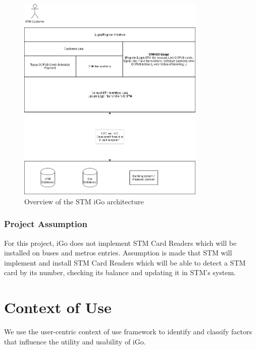 \documentclass[11pt, english]{article}
\begin{document}
\begin{figure}[H]
  
  \includegraphics[width=0.8\textwidth]{ContextOfUse.png}
  \centering
  \caption{ Overview of the STM iGo architecture}

\end{figure}

\subsubsection{Project Assumption}

For this project, iGo does not implement STM Card Readers which will be installed on buses and metros entries. Assumption is made that STM will implement and install STM Card Readers which will be able to detect a STM card by its number, checking its balance and updating it in STM’s system.

\section{Context of Use}

We use the user-centric context of use framework \cite{contextofusecasekamthan}  to identify and classify factors that influence the utility and usability of iGo.\\
\end{document}
